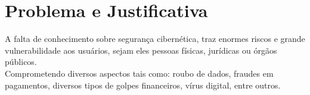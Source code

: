 \section{Problema e Justificativa}
\label{justificativa}

 A falta de conhecimento sobre segurança cibernética, traz enormes riscos e grande vulnerabilidade aos usuários, sejam eles pessoas físicas, jurídicas ou órgãos públicos. \\
 Comprometendo diversos aspectos tais como: roubo de dados, fraudes em pagamentos, diversos tipos de golpes financeiros, vírus digital, entre outros.


